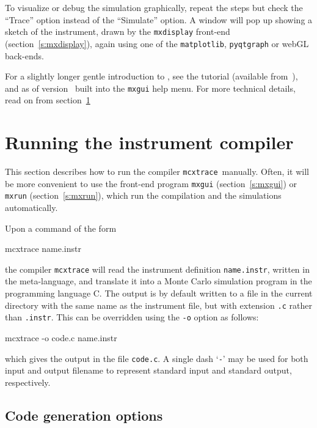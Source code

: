 To visualize or
debug the simulation graphically, repeat the steps but check the ``Trace''
option instead of the ``Simulate'' option.  A window will pop up showing a
sketch of the instrument, drawn by the \texttt{mxdisplay} front-end
(section~\ref{s:mxdisplay}), again using one of the \texttt{matplotlib},
\texttt{pyqtgraph} or webGL back-ends.

For a slightly longer gentle introduction to \MCX, see the \MCX tutorial
(available from~\cite{mcxtrace_webpage}), and as of version \version\ built into
the \verb+mxgui+ help menu. For more technical details, read on from
section~\ref{s:running}



\section{Running the instrument compiler}
\label{s:running}

This section describes how to run the \MCX compiler \texttt{mcxtrace}\ manually. Often,
it will be more convenient to use the front-end program \verb+mxgui+
(section~\ref{s:mxgui}) or \verb+mxrun+ (section~\ref{s:mxrun}),
which run the compilation and the simulations automatically.

Upon a command of the form
\begin{bash}
    mcxtrace name.instr
\end{bash}
the compiler \texttt{mcxtrace} will read the instrument definition \verb+name.instr+,
written in the \MCX meta-language,
and translate it into a Monte Carlo simulation program in
the programming language C.
The output is by default written to a file in the current
directory with the same name as the instrument file, but with extension
\verb+.c+ rather than \verb+.instr+. This can be overridden using the
\verb+-o+ option as follows:
\begin{bash}
    mcxtrace -o code.c name.instr
\end{bash}
which gives the output in the file \verb+code.c+.
A single dash `\verb+-+' may be used for both input and output filename
to represent standard input and standard output, respectively.


\subsection{Code generation options}

